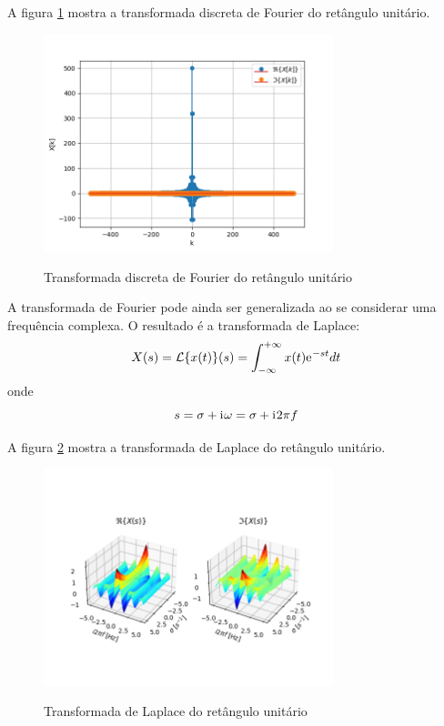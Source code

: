 \documentclass[12pt,a4paper]{report}
\newcommand{\I}{{\mathrm{i}\mkern1mu}}
\newcommand{\euler}{{\mathrm{e}\mkern1mu}}
\begin{document}
  A figura \ref{fig:discrete_fourier_transform} mostra a transformada discreta de Fourier do retângulo unitário.
  \begin{figure}[H]
    \caption{Transformada discreta de Fourier do retângulo unitário}
    \centering
    \includegraphics[width=0.75\textwidth]{discrete_fourier_transform}
    \label{fig:discrete_fourier_transform}
  \end{figure}

  A transformada de Fourier pode ainda ser generalizada ao se considerar uma frequência complexa. O resultado
  é a transformada de Laplace:
  \begin{equation}
    X(s) = \mathcal{L}\{x(t)\}(s) = \int_{-\infty}^{+\infty} x(t) \euler^{-s t} dt
  \end{equation}
  onde
  \begin{equation}
    s = \sigma + \I \omega = \sigma + \I 2 \pi f
  \end{equation}

  A figura \ref{fig:laplace_transform} mostra a transformada de Laplace do retângulo unitário.
  \begin{figure}[H]
    \caption{Transformada de Laplace do retângulo unitário}
    \centering
    \includegraphics[width=0.75\textwidth]{laplace_transform}
    \label{fig:laplace_transform}
  \end{figure}
\end{document}
